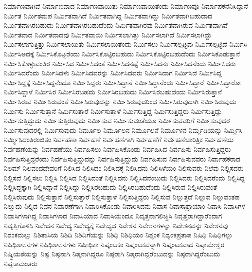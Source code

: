 {ನಿರ್ಮಾಣವಾಗಿವೆ
ನಿರ್ಮಾಣವಾದ
ನಿರ್ಮಾಣವಾಯಿತು
ನಿರ್ಮಾಣವಾಯಿತೆಂದು
ನಿರ್ಮಾಣವೂ
ನಿರ್ಮಾಪಕನೆನಿಸಿದ್ದಾನೆ
ನಿರ್ಮಿತ
ನಿರ್ಮಿತಮಪ
ನಿರ್ಮಿತವಾಗಿದೆ
ನಿರ್ಮಿತವಾಗಿದ್ದ
ನಿರ್ಮಿತವಾಗಿದ್ದು
ನಿರ್ಮಿತವಾಗಿಬಹುದಾದ
ನಿರ್ಮಿತವಾಗಿರಬಹುದು
ನಿರ್ಮಿತವಾಗಿರಬಹುದೆಂದು
ನಿರ್ಮಿತವಾಗಿರವು
ನಿರ್ಮಿತವಾಗಿರುವ
ನಿರ್ಮಿತವಾಗಿವೆ
ನಿರ್ಮಿತವಾದ
ನಿರ್ಮಿತವಾದವು
ನಿರ್ಮಿತವಾಯಿ
ನಿರ್ಮಿಸಲಾಗಿತ್ತು
ನಿರ್ಮಿಸಲಾಗಿದೆ
ನಿರ್ಮಿಸಲಾಗಿದ್ದು
ನಿರ್ಮಿಸಲಾಗುತ್ತಿತ್ತು
ನಿರ್ಮಿಸಲಾಯಿತು
ನಿರ್ಮಿಸಲಾಯಿತೆಂದು
ನಿರ್ಮಿಸಲು
ನಿರ್ಮಿಸಲ್ಪಟ್ಟವು
ನಿರ್ಮಿಸಲ್ಪಟ್ಟಿದೆ
ನಿರ್ಮಿಸಿ
ನಿರ್ಮಿಸಿಅದಕ್ಕೆ
ನಿರ್ಮಿಸಿಕೊಟ್ಟರೆಂದು
ನಿರ್ಮಿಸಿಕೊಟ್ಟಿರಬಹುದು
ನಿರ್ಮಿಸಿಕೊಟ್ಟಿರಬಹುದೆಂದು
ನಿರ್ಮಿಸಿಕೊಡುತ್ತಾನೆ
ನಿರ್ಮಿಸಿಕೊಳ್ಳುವಂತಿರ
ನಿರ್ಮಿಸಿದ
ನಿರ್ಮಿಸಿದಂತೆ
ನಿರ್ಮಿಸಿದನಷ್ಟೆ
ನಿರ್ಮಿಸಿದನು
ನಿರ್ಮಿಸಿದನೆಂದು
ನಿರ್ಮಿಸಿದರು
ನಿರ್ಮಿಸಿದರೆಂದು
ನಿರ್ಮಿಸಿದಳು
ನಿರ್ಮಿಸಿದವರನ್ನು
ನಿರ್ಮಿಸಿದವರು
ನಿರ್ಮಿಸಿದಾಗ
ನಿರ್ಮಿಸಿದೆ
ನಿರ್ಮಿಸಿದ್ದ
ನಿರ್ಮಿಸಿದ್ದಕ್ಕೆ
ನಿರ್ಮಿಸಿದ್ದನೆಂದೂ
ನಿರ್ಮಿಸಿದ್ದರು
ನಿರ್ಮಿಸಿದ್ದಾನೆ
ನಿರ್ಮಿಸಿದ್ದಾನೆಂದು
ನಿರ್ಮಿಸಿದ್ದಾರೆ
ನಿರ್ಮಿಸಿದ್ದಾರೋ
ನಿರ್ಮಿಸಿದ್ದಾಳೆ
ನಿರ್ಮಿಸಿರ
ನಿರ್ಮಿಸಿರಬಹದು
ನಿರ್ಮಿಸಿರಬಹುದು
ನಿರ್ಮಿಸಿರಬಹುದೆಂದು
ನಿರ್ಮಿಸಿರುತ್ತಾನೆ
ನಿರ್ಮಿಸಿರುವ
ನಿರ್ಮಿಸಿರುವಂತೆ
ನಿರ್ಮಿಸಿರುವುದನ್ನು
ನಿರ್ಮಿಸಿರುವುದರಿಂದ
ನಿರ್ಮಿಸಿರುವುದಾಗಿ
ನಿರ್ಮಿಸಿರುವುದು
ನಿರ್ಮಿಸು
ನಿರ್ಮಿಸುತ್ತಾನೆ
ನಿರ್ಮಿಸುತ್ತಾರೆ
ನಿರ್ಮಿಸುತ್ತಾಳೆ
ನಿರ್ಮಿಸುತ್ತಿದ್ದ
ನಿರ್ಮಿಸುತ್ತಿದ್ದರು
ನಿರ್ಮಿಸುತ್ತಿದ್ದು
ನಿರ್ಮಿಸುತ್ತಿದ್ದುದು
ನಿರ್ಮಿಸುತ್ತಿರುವುದು
ನಿರ್ಮಿಸುವ
ನಿರ್ಮಿಸುವಂತೆಯೂ
ನಿರ್ಮಿಸುವವರಿಗೆ
ನಿರ್ಮಿಸುವುದರ
ನಿರ್ಮಿಸುವುದರಲ್ಲಿ
ನಿರ್ಮಿಸುವುದು
ನಿರ್ಮೂಲ
ನಿರ್ಮೂಲನ
ನಿರ್ಮೂಲನೆ
ನಿರ್ಮೂಳನ
ನಿರ್ಮ್ಮಡಿಯನ್ನು
ನಿರ್ಮ್ಮಿಸಿ
ನಿರ್ಮ್ಮಿಸಿದಂತಿರಂಜಿತಂ
ನಿರ್ವಹಣಾ
ನಿರ್ವಹಣೆ
ನಿರ್ವಹಣೆಗಾಗಿ
ನಿರ್ವಹಣೆಗೆ
ನಿರ್ವಹಣೆಚಾರಿತ್ರಿಕ
ನಿರ್ವಹಣೆಯ
ನಿರ್ವಹಣೆಯನ್ನು
ನಿರ್ವಹಣೆಯು
ನಿರ್ವಹಿಸಲು
ನಿರ್ವಹಿಸಿಕೊಂಡು
ನಿರ್ವಹಿಸಿದ
ನಿರ್ವಹಿಸು
ನಿರ್ವಹಿಸುತ್ತಿದ್ದರು
ನಿರ್ವಹಿಸುತ್ತಿದ್ದರೆಂದು
ನಿರ್ವಹಿಸುತ್ತಿದ್ದುದನ್ನು
ನಿರ್ವಹಿಸುತ್ತಿದ್ದುದು
ನಿರ್ವಹಿಸುವ
ನಿರ್ವಹಿಸುವವರು
ನಿರ್ವಾಹಕರಾದ
ನಿಲಮ್
ನಿಲವಂದದೇವರಿಗೆ
ನಿಲಿಸಿದ
ನಿಲಿಸಿದಂ
ನಿಲಿಸಿದಕ್ಕೆ
ನಿಲಿಸಿದನು
ನಿಲಿಸಿಳೆಯಂ
ನಿಲಿಸುವರು
ನಿಲೆವು
ನಿಲ್ಲಿಸದರು
ನಿಲ್ಲಿಸದೆ
ನಿಲ್ಲಿಸಲು
ನಿಲ್ಲಿಸಿ
ನಿಲ್ಲಿಸಿದ
ನಿಲ್ಲಿಸಿದಂತೆ
ನಿಲ್ಲಿಸಿದನು
ನಿಲ್ಲಿಸಿದನೆಂಬುದು
ನಿಲ್ಲಿಸಿದರು
ನಿಲ್ಲಿಸಿದರೆಂದು
ನಿಲ್ಲಿಸಿದ್ದ
ನಿಲ್ಲಿಸಿದ್ದಕ್ಕಾಗಿ
ನಿಲ್ಲಿಸಿದ್ದಾನೆ
ನಿಲ್ಲಿಸಿದ್ದು
ನಿಲ್ಲಿಸಿರಬಹುದು
ನಿಲ್ಲಿಸಿರಬಹುದೆಂದು
ನಿಲ್ಲಿಸಿರುವ
ನಿಲ್ಲಿಸಿರುವಂತೆ
ನಿಲ್ಲಿಸಿರುವುದು
ನಿಲ್ಲಿಸುತ್ತಾನೆ
ನಿಲ್ಲಿಸುತ್ತಾರೆ
ನಿಲ್ಲಿಸುತ್ತಾಳೆ
ನಿಲ್ಲಿಸುತ್ತಿದ್ದರು
ನಿಲ್ಲಿಸುವ
ನಿಲ್ಲುತ್ತದೆ
ನಿಲ್ಲುವ
ನಿಲ್ಲುವಂತಹ
ನಿಲ್ವುದು
ನಿಲ್ಸಿದ
ನಿವನ
ನಿವಾರಣೆಗಾಗಿ
ನಿವಾರಿಸಿಕೊಂಡು
ನಿವಾರಿಸಿದನು
ನಿವಾಸ
ನಿವಾಸಾಶ್ರಾಯಾಂ
ನಿವಾಸಿ
ನಿವಾಸಿಗಳ
ನಿವಾಸಿಗಳಾಗಿದ್ದ
ನಿವಾಸಿಗಳಾದ
ನಿವಾಸಿಯಾದ
ನಿವಾಸಿಯೆಂದೂ
ನಿವೃತ್ತನಾಗಲಿಚ್ಚಿಸಿ
ನಿವೃತ್ತರಾಗಿದ್ದಾರೆಂದಾಗ
ನಿವೃತ್ತಿಗೊಳಿಸಿ
ನಿವೇದನ
ನಿವೇದ್ಯ
ನಿವೇದ್ಯಕ್ಕೆ
ನಿವೇದ್ಯದ
ನಿವೇಶನ
ನಿವೇಶನಗಳನ್ನು
ನಿವೇಶನವನ್ನು
ನಿವೇಶನವು
ನಿಶಂಕಮಲ್ಲು
ನಿಶಿತಾಸಿಯ
ನಿಶಿದಿ
ನಿಶಿದಿಗೆಯನ್ನು
ನಿಶಿಧಿ
ನಿಶಿಧಿಯಂ
ನಿಶ್ಶಂಕ
ನಿಶ್ಶಂಕಪ್ರತಾಪ
ನಿಷಿಧಿ
ನಿಷಿಧಿಗಲ್ಲು
ನಿಷಿಧಿಶಾಸನಗಳ
ನಿಷಿಧಿಶಾಸನಗಳು
ನಿಷೀಧಿಕಾ
ನಿಷ್ಕಂಟಕಂ
ನಿಷ್ಕಂಟಕವನ್ನಾಗಿ
ನಿಷ್ಕಂಟಕವಾದ
ನಿಷ್ಕಾಮೇಶ್ವರ
ನಿಷ್ಕ್ರಿಯತೆಯನ್ನು
ನಿಷ್ಟ
ನಿಷ್ಠನಾಗಿ
ನಿಷ್ಠನಾಗಿದ್ದರೂ
ನಿಷ್ಠರಾಗಿ
ನಿಷ್ಠರಾಗಿದ್ದರೆಂಬುದನ್ನು
ನಿಷ್ಠರಾಗಿದ್ದರೆಂಬುದು
ನಿಷ್ಠಸಾಮಂತರು
}
